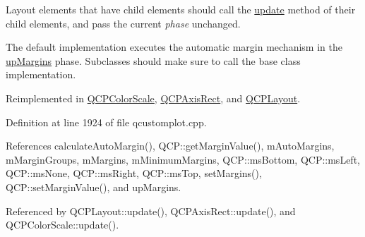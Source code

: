 Layout elements that have child elements should call the \hyperlink{class_q_c_p_layout_element_a929c2ec62e0e0e1d8418eaa802e2af9b}{update} method of their child elements, and pass the current {\itshape phase} unchanged.

The default implementation executes the automatic margin mechanism in the \hyperlink{class_q_c_p_layout_element_a0d83360e05735735aaf6d7983c56374da288cb59a92280e47261a341f2813e676}{up\+Margins} phase. Subclasses should make sure to call the base class implementation. 

Reimplemented in \hyperlink{class_q_c_p_color_scale_ab8f6991ac88243fc582b44b183670334}{Q\+C\+P\+Color\+Scale}, \hyperlink{class_q_c_p_axis_rect_a255080a017df9083a60a321ef2ba9ed8}{Q\+C\+P\+Axis\+Rect}, and \hyperlink{class_q_c_p_layout_a34ab477e820537ded7bade4399c482fd}{Q\+C\+P\+Layout}.



Definition at line 1924 of file qcustomplot.\+cpp.



References calculate\+Auto\+Margin(), Q\+C\+P\+::get\+Margin\+Value(), m\+Auto\+Margins, m\+Margin\+Groups, m\+Margins, m\+Minimum\+Margins, Q\+C\+P\+::ms\+Bottom, Q\+C\+P\+::ms\+Left, Q\+C\+P\+::ms\+None, Q\+C\+P\+::ms\+Right, Q\+C\+P\+::ms\+Top, set\+Margins(), Q\+C\+P\+::set\+Margin\+Value(), and up\+Margins.



Referenced by Q\+C\+P\+Layout\+::update(), Q\+C\+P\+Axis\+Rect\+::update(), and Q\+C\+P\+Color\+Scale\+::update().


